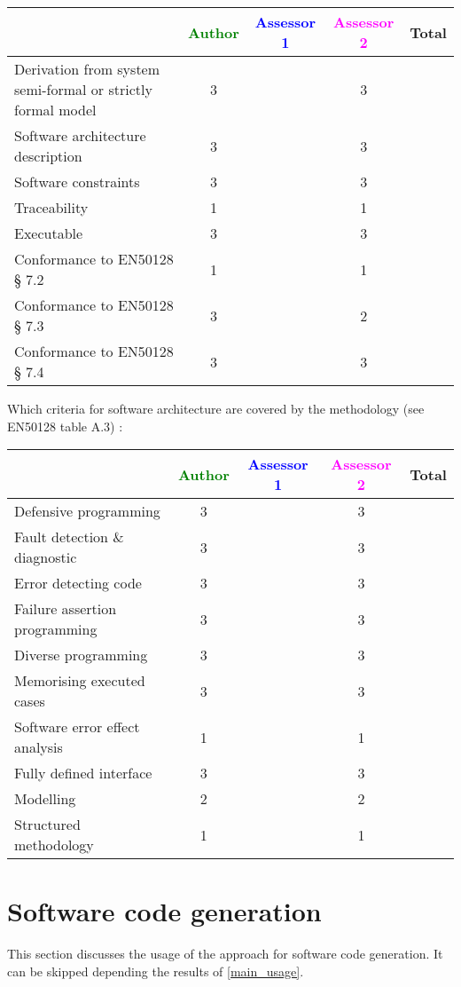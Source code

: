 \begin{tabular}{|l | c | c | c | c|}
\hline
& \textcolor{green}{Author} & \textcolor{blue}{Assessor 1} & \textcolor{magenta}{Assessor 2} & Total \\
\hline
Derivation from system semi-formal or strictly formal model  & 3 & & 3 &  \\
\hline 
Software architecture description  & 3 & & 3 &  \\
\hline
Software constraints  & 3 & & 3 &  \\
\hline
Traceability  & 1 & & 1 &  \\
\hline
Executable  & 3 & & 3 &  \\
\hline
Conformance to EN50128 § 7.2  & 1 & & 1 &  \\
\hline
Conformance to EN50128 § 7.3  & 3 & & 2 &  \\
\hline
Conformance to EN50128 § 7.4  & 3 & & 3 &  \\
\hline
\end{tabular}

Which criteria for software architecture are covered by the methodology
(see EN50128 table A.3) :

\begin{tabular}{|l | c | c | c | c|}
\hline
& \textcolor{green}{Author} & \textcolor{blue}{Assessor 1} & \textcolor{magenta}{Assessor 2} & Total \\
\hline
Defensive programming  & 3 & & 3 &  \\
\hline 
Fault detection \& diagnostic  & 3 & & 3 &  \\
\hline
Error detecting code  & 3 & & 3 &  \\
\hline
Failure assertion programming & 3 & & 3 &  \\
\hline
Diverse programming & 3 & & 3 &  \\
\hline
Memorising executed cases & 3 & & 3 &  \\
\hline
Software error effect analysis & 1 & & 1 &  \\
\hline
Fully defined interface & 3 & & 3 &  \\
\hline
Modelling  & 2 & & 2&  \\
\hline
Structured methodology & 1 & & 1 &  \\
\hline
\end{tabular}

\section{Software code generation}
This section discusses the usage of the approach for software code generation.
It can be skipped depending the results of \ref{main_usage}.

